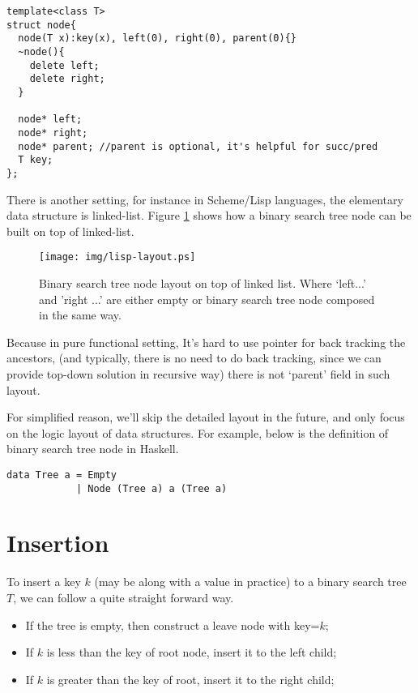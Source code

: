 \documentclass{article}
\begin{document}
\lstset{language=C++}
\begin{lstlisting}
template<class T>
struct node{
  node(T x):key(x), left(0), right(0), parent(0){}
  ~node(){
    delete left;
    delete right;
  }

  node* left;
  node* right;
  node* parent; //parent is optional, it's helpful for succ/pred
  T key;
};
\end{lstlisting}

There is another setting, for instance in Scheme/Lisp languages, the elementary
data structure is linked-list. Figure \ref{fig:lisp-layout} shows how a binary
search tree node can be built on top of linked-list.

\begin{figure}[htbp]
       \begin{center}
        \texttt{[image: img/lisp-layout.ps]}
        \caption{Binary search tree node layout on top of linked list. Where `left...' and 'right ...' are either empty or binary search tree node composed in the same way.} \label{fig:lisp-layout}
       \end{center}
\end{figure}

Because in pure functional setting, It's hard to use pointer for back tracking
the ancestors, (and typically, there is no need to do back tracking, since
we can provide top-down solution in recursive way) there is not `parent' field
in such layout.

For simplified reason, we'll skip the detailed layout in the future, and only
focus on the logic layout of data structures. For example, below is the definition
of binary search tree node in Haskell.

\lstset{language=Haskell}
\begin{lstlisting}
data Tree a = Empty
            | Node (Tree a) a (Tree a)
\end{lstlisting}

\section{Insertion}

To insert a key $k$ (may be along with a value in practice) to a binary search tree $T$, we can follow a quite straight forward way.

\begin{itemize}
\item If the tree is empty, then construct a leave node with key=$k$;
\item If $k$ is less than the key of root node, insert it to the left child;
\item If $k$ is greater than the key of root, insert it to the right child;
\end{itemize}
\end{document}
